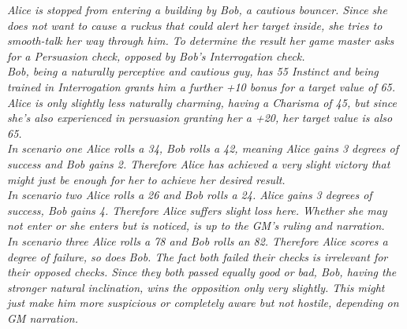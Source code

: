 \documentclass[12pt,a4paper]{book}
\newenvironment{exampleblock}[1][1]
{\hfill\begin{minipage}{\dimexpr\textwidth-#1cm}}
{\end{minipage}}
\begin{document}
	\begin{exampleblock}\textit{
	Alice is stopped from entering a building by Bob, a cautious bouncer. Since she does not want to cause a ruckus that could alert her target inside, she tries to smooth-talk her way through him. To determine the result her game master asks for a Persuasion check, opposed by Bob’s Interrogation check.\\
	Bob, being a naturally perceptive and cautious guy, has 55 Instinct and being trained in Interrogation grants him a further +10 bonus for a target value of 65. Alice is only slightly less naturally charming, having a Charisma of 45, but since she’s also experienced in persuasion granting her a +20, her target value is also 65.\\
	In scenario one Alice rolls a 34, Bob rolls a 42, meaning Alice gains 3 degrees of success and Bob gains 2. Therefore Alice has achieved a very slight victory that might just be enough for her to achieve her desired result.\\
	In scenario two Alice rolls a 26 and Bob rolls a 24. Alice gains 3 degrees of success, Bob gains 4. Therefore Alice suffers slight loss here. Whether she may not enter or she enters but is noticed, is up to the GM’s ruling and narration.\\
	In scenario three Alice rolls a 78 and Bob rolls an 82. Therefore Alice scores a degree of failure, so does Bob. The fact both failed their checks is irrelevant for their opposed checks. Since they both passed equally good or bad, Bob, having the stronger natural inclination, wins the opposition only very slightly. This might just make him more suspicious or completely aware but not hostile, depending on GM narration.\\
		}
	\end{exampleblock}
\end{document}
